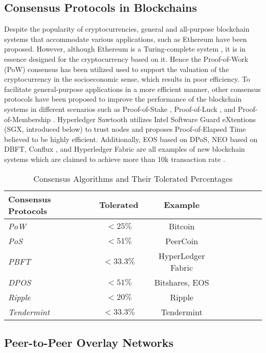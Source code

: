 \subsection{Consensus Protocols in Blockchains}

Despite the popularity of cryptocurrencies, general and all-purpose blockchain systems that accommodate various applications, such as Ethereum \cite{wood2014ethereum} have been proposed. However, although Ethereum is a Turing-complete system \cite{wood2014ethereum}, it is in essence designed for the cryptocurrency based on it. Hence the Proof-of-Work (PoW) consensus has been utilized used to support the valuation of the cryptocurrency in the socioeconomic sense, which results in poor efficiency. To facilitate general-purpose applications in a more efficient manner, other consensus protocols have been proposed to improve the performance of the blockchain systems in different scenarios such as Proof-of-Stake \cite{kiayias2017ouroboros}, Proof-of-Luck \cite{milutinovic2016proof}, and Proof-of-Membership \cite{kogias2016enhancing}. Hyperledger Sawtooth \cite{sawtooth} utilizes Intel Software Guard eXtentions (SGX, introduced below) to trust nodes and proposes Proof-of-Elapsed Time believed to be highly efficient. Additionally, EOS \cite{eosio} based on DPoS, NEO \cite{hoxha2018hashgraph} based on DBFT, Conflux \cite{li2018scaling}, and Hyperledger Fabric \cite{cachin2016architecture} are all examples of new blockchain systems which are claimed to achieve more than 10k transaction rate \cite{bach2018comparative}.

\begin{table}
	\begin{tabular}{l*{6}{c}r}
		Consensus Protocols & Tolerated & Example \\
		\hline		
		\textit{PoW} & $<25\%$ & Bitcoin \\
		\textit{PoS} & $<51\%$ & PeerCoin \\
		\textit{PBFT} & $<33.3\%$ & HyperLedger Fabric \\
		\textit{DPOS} & $<51\%$ & Bitshares, EOS\\
		\textit{Ripple} & $<20\%$ & Ripple \\
		\textit{Tendermint} & $<33.3\%$ & Tendermint \\
	\end{tabular}
	\caption{Consensus Algorithms and Their Tolerated Percentages}
	\label{tab:packet1}
\end{table}

\subsection{Peer-to-Peer Overlay Networks}

